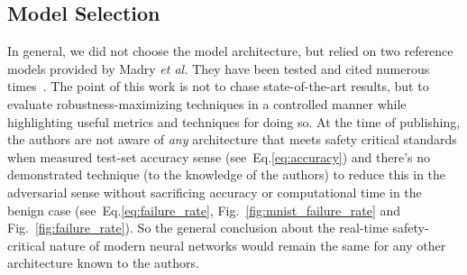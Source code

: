 \subsection{Model Selection}
In general, we did not choose the model architecture, but relied on two reference models provided by Madry \textit{et al.}
They have been tested and cited numerous times~\cite{madry2017towards}.
The point of this work is not to chase state-of-the-art results, but to evaluate robustness-maximizing techniques in a controlled manner while highlighting useful metrics and techniques for doing so.
At the time of publishing, the authors are not aware of \textit{any} architecture that meets safety critical standards when measured test-set accuracy sense (see~Eq.\ref{eq:accuracy}) and there's no demonstrated technique (to the knowledge of the authors) to reduce this in the adversarial sense without sacrificing accuracy or computational time in the benign case (see~Eq.\ref{eq:failure_rate}, Fig.~\ref{fig:mnist_failure_rate} and Fig.~\ref{fig:failure_rate}).
So the general conclusion about the real-time safety-critical nature of modern neural networks would remain the same for any other architecture known to the authors.

